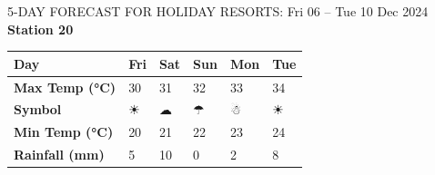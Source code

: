 \begin{frame}{5-DAY FORECAST FOR HOLIDAY RESORTS: Fri 06 – Tue 10 Dec 2024}
        \textbf{Station 20} \\
        \renewcommand{\arraystretch}{1.2} %
        \begin{tabular}{|p{2cm}|p{1.8cm}|p{1.8cm}|p{1.8cm}|p{1.8cm}|p{1.8cm}|}
        \hline
        \textbf{Day} & Fri & Sat & Sun & Mon & Tue \\ \hline
\textbf{Max Temp (°C)} & 30 & 31 & 32 & 33 & 34 \\ \hline
\textbf{Symbol} & ☀ & ☁ & ☂ & ☃ & ☀ \\ \hline
\textbf{Min Temp (°C)} & 20 & 21 & 22 & 23 & 24 \\ \hline
\textbf{Rainfall (mm)} & 5 & 10 & 0 & 2 & 8 \\ \hline
        \end{tabular}
        \vspace{0.5cm} %
        \end{frame}